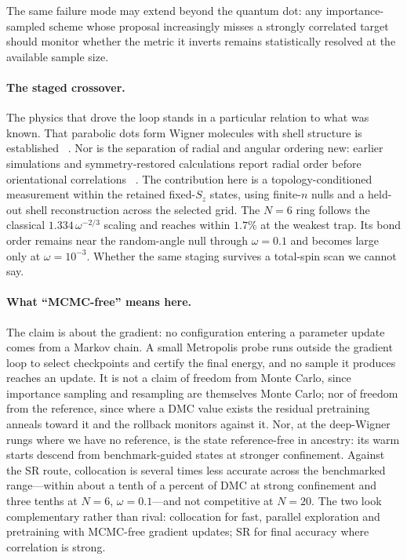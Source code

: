 The same failure mode may extend beyond the quantum dot: any importance-sampled scheme whose
proposal increasingly misses a strongly correlated target should monitor whether the metric
it inverts remains statistically resolved at the available sample size.

\paragraph{The staged crossover.}
The physics that drove the loop stands in a particular relation to what was known. That
parabolic dots form Wigner molecules with shell structure is established
~\cite{Egger_1999,Filinov_2001,Kong_2002,manninen2007metalclustersquantumdots,Ghosal2007-WignerMolecules}.
Nor is the separation of radial and angular ordering new: earlier simulations and
symmetry-restored calculations report radial order before orientational correlations
~\cite{Filinov_2001,Cavaliere2009-WignerTransport}. The contribution here is a
topology-conditioned measurement within the retained fixed-$S_z$ states, using finite-$n$
nulls and a held-out shell reconstruction across the selected grid. The $N{=}6$ ring follows
the classical $1.334\,\omega^{-2/3}$ scaling and reaches within $1.7\%$ at the weakest trap.
Its bond order remains near the random-angle null through $\omega=0.1$ and becomes large only
at $\omega=10^{-3}$. Whether the same staging
survives a total-spin scan we cannot say.

\paragraph{What ``MCMC-free'' means here.}
\label{sec:collocation-discussion}
The claim is about the gradient: no configuration entering a parameter update comes from a
Markov chain. A small Metropolis probe runs outside the gradient loop to select checkpoints
and certify the final energy, and no sample it produces reaches an update. It is not a claim
of freedom from Monte Carlo, since importance sampling and resampling are themselves Monte
Carlo; nor of freedom from the reference, since where a DMC value exists the residual
pretraining anneals toward it and the rollback monitors against it. Nor, at the deep-Wigner
rungs where we have no reference, is the state reference-free in ancestry: its warm starts
descend from benchmark-guided states at stronger confinement. Against the SR route,
collocation is several times less accurate across the benchmarked range---within about a
tenth of a percent of DMC at strong confinement and three tenths at $N{=}6$,
$\omega{=}0.1$---and not competitive at $N{=}20$. The two look complementary rather
than rival: collocation for fast, parallel exploration and pretraining with MCMC-free
gradient updates; SR for
final accuracy where correlation is strong.

